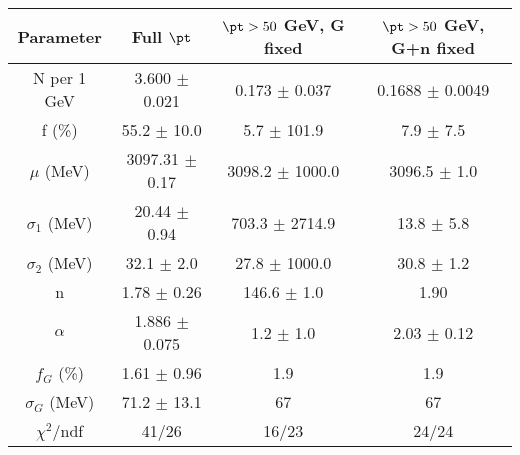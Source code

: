 \begin{tabular}{c||c|c|c}
Parameter & Full $\pt$ & $\pt>50$ GeV, G fixed & $\pt>50$ GeV, G+n fixed \\
\hline
N per 1 GeV & 3.600 $\pm$ 0.021 & 0.173 $\pm$ 0.037 & 0.1688 $\pm$ 0.0049\\
f (\%) & 55.2 $\pm$ 10.0 & 5.7 $\pm$ 101.9 & 7.9 $\pm$ 7.5\\
$\mu$ (MeV) & 3097.31 $\pm$ 0.17 & 3098.2 $\pm$ 1000.0 & 3096.5 $\pm$ 1.0\\
$\sigma_1$ (MeV) & 20.44 $\pm$ 0.94 & 703.3 $\pm$ 2714.9 & 13.8 $\pm$ 5.8\\
$\sigma_2$ (MeV) & 32.1 $\pm$ 2.0 & 27.8 $\pm$ 1000.0 & 30.8 $\pm$ 1.2\\
n & 1.78 $\pm$ 0.26 & 146.6 $\pm$ 1.0 & 1.90\\
$\alpha$ & 1.886 $\pm$ 0.075 & 1.2 $\pm$ 1.0 & 2.03 $\pm$ 0.12\\
$f_G$ (\%) & 1.61 $\pm$ 0.96 & 1.9 & 1.9\\
$\sigma_G$ (MeV) & 71.2 $\pm$ 13.1 & 67 & 67\\
\hline
$\chi^2$/ndf & 41/26 & 16/23 & 24/24\\
\end{tabular}
